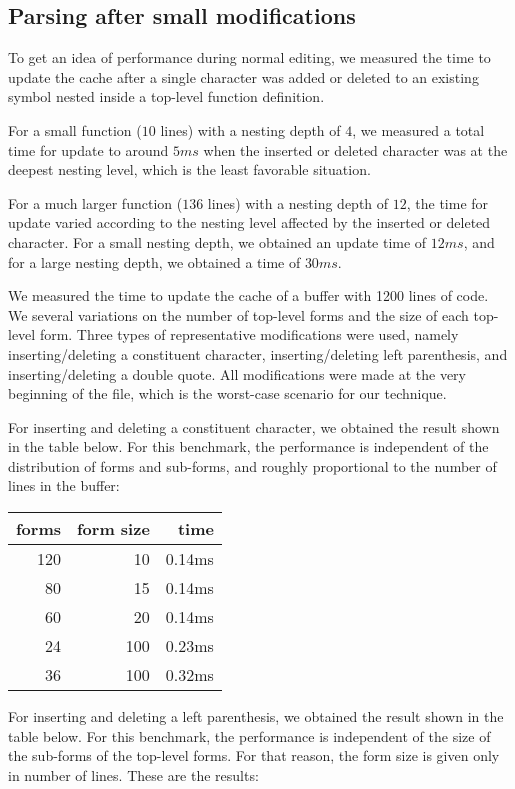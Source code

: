 \subsection{Parsing after small modifications}

To get an idea of performance during normal editing, we measured the
time to update the cache after a single character was added or deleted
to an existing symbol nested inside a top-level function definition.

For a small function ($10$ lines) with a nesting depth of $4$, we
measured a total time for update to around $5ms$ when the inserted or
deleted character was at the deepest nesting level, which is the least
favorable situation.

For a much larger function ($136$ lines) with a nesting depth of $12$,
the time for update varied according to the nesting level affected by
the inserted or deleted character.  For a small nesting depth, we
obtained an update time of $12ms$, and for a large nesting depth, we
obtained a time of $30ms$.

We measured the time to update the cache of a buffer with 1200 lines
of \commonlisp{} code.  We several variations on the number of
top-level forms and the size of each top-level form.  Three types of
representative modifications were used, namely inserting/deleting a
constituent character, inserting/deleting left parenthesis, and
inserting/deleting a double quote.  All modifications were made at the
very beginning of the file, which is the worst-case scenario for our
technique.

For inserting and deleting a constituent character, we obtained the
result shown in the table below.  For this benchmark, the performance
is independent of the distribution of forms and sub-forms, and roughly
proportional to the number of lines in the buffer:

\vskip 0.3cm
\begin{tabular}{|r|r|r|}
\hline
forms & form size & time\\
\hline
120 & 10 & 0.14ms\\
80 & 15  & 0.14ms\\
60 & 20  & 0.14ms\\
24 & 100 & 0.23ms\\
36 & 100 & 0.32ms\\
\hline
\end{tabular}
\vskip 0.3cm

For inserting and deleting a left parenthesis, we obtained the
result shown in the table below.  For this benchmark, the performance
is independent of the size of the sub-forms of the top-level forms.
For that reason, the form size is given only in number of lines.
These are the results:

